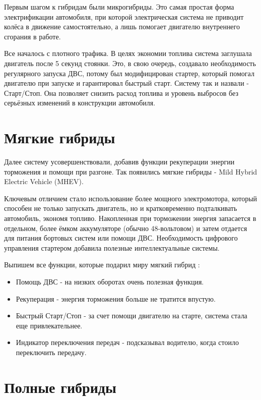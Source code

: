 Первым шагом к гибридам были микрогибриды. Это самая простая форма электрификации автомобиля, при которой электрическая система не приводит колёса в движение самостоятельно, а лишь помогает двигателю внутреннего сгорания в работе.

Все началось с плотного трафика. В целях экономии топлива система заглушала двигатель после 5 секунд стоянки. Это, в свою очередь, создавало необходимость регулярного запуска ДВС, потому был модифицирован стартер, который помогал двигателю при запуске и гарантировал быстрый старт. Систему так и назвали - Старт/Стоп. Она позволяет снизить расход топлива и уровень выбросов без серьёзных изменений в конструкции автомобиля.

\section{Мягкие гибриды}

Далее систему усовершенствовали, добавив функции рекуперации энергии торможения и помощи при разгоне. Так появились мягкие гибриды - Mild Hybrid Electric Vehicle (MHEV).

Ключевым отличием стало использование более мощного электромотора, который способен не только запускать двигатель, но и кратковременно подталкивать автомобиль, экономя топливо. Накопленная при торможении энергия запасается в отдельном, более ёмком аккумуляторе (обычно 48-вольтовом) и затем отдается для питания бортовых систем или помощи ДВС. Необходимость цифрового управления стартером добавила полезные интеллектуальные системы.

Выпишем все функции, которые подарил миру мягкий гибрид \cite{Amrinder}:

\begin{itemize}[label=--]
    \item Помощь ДВС - на низких оборотах очень полезная функция.
    \item Рекуперация - энергия торможения больше не тратится впустую.
    \item Быстрый Старт/Стоп - за счет помощи двигателю на старте, система стала еще привлекательнее.
    \item Индикатор переключения передач - подсказывал водителю, когда стоило переключить передачу.
\end{itemize}

\newpage

\section{Полные гибриды}

